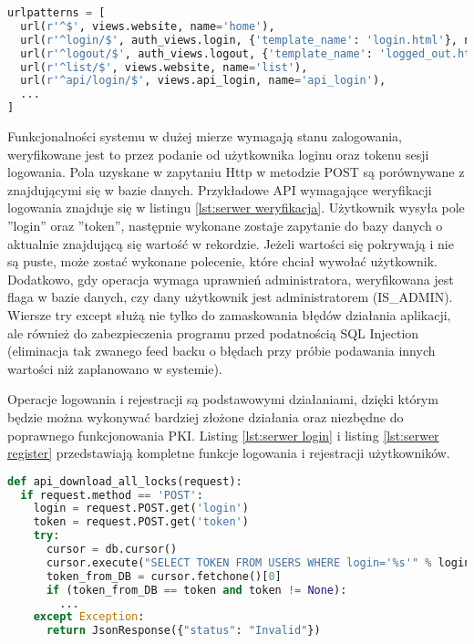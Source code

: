 {\footnotesize 
\begin{lstlisting}[caption={Fragment pliku urls.py}, label={lst:python url}, language=Python]
urlpatterns = [
  url(r'^$', views.website, name='home'),
  url(r'^login/$', auth_views.login, {'template_name': 'login.html'}, name='login'),
  url(r'^logout/$', auth_views.logout, {'template_name': 'logged_out.html'}, name='logout'),
  url(r'^list/$', views.website, name='list'),
  url(r'^api/login/$', views.api_login, name='api_login'),
  ...
]
\end{lstlisting}}

	Funkcjonalności systemu w  dużej mierze wymagają stanu zalogowania, weryfikowane jest to przez podanie od użytkownika loginu oraz tokenu sesji logowania. Pola uzyskane w zapytaniu Http w metodzie POST są porównywane z znajdującymi się w bazie danych. Przykładowe API wymagające weryfikacji logowania znajduje się w listingu \ref{lst:serwer weryfikacja}. Użytkownik wysyła pole ''login'' oraz ''token'', następnie wykonane zostaje zapytanie do bazy danych o aktualnie znajdującą się wartość w rekordzie. Jeżeli wartości się pokrywają i nie są puste, może zostać wykonane polecenie, które chciał wywołać użytkownik. Dodatkowo, gdy operacja wymaga uprawnień administratora, weryfikowana jest flaga w bazie danych, czy dany użytkownik jest administratorem (IS\_ADMIN). Wiersze try except służą nie tylko do zamaskowania błędów działania aplikacji, ale również do zabezpieczenia programu przed podatnością SQL Injection (eliminacja tak zwanego feed backu o błędach przy próbie podawania innych wartości niż zaplanowano w systemie).
	
	Operacje logowania i rejestracji są podstawowymi działaniami, dzięki którym będzie można wykonywać bardziej złożone działania oraz niezbędne do poprawnego funkcjonowania PKI. Listing \ref{lst:serwer login} i listing \ref{lst:serwer register} przedstawiają kompletne funkcje logowania i rejestracji użytkowników. 
\newpage	
	{\footnotesize 
	\begin{lstlisting}[caption={Przykładowe API weryfikujące stan logowania}, label={lst:serwer weryfikacja}, language=Python]
def api_download_all_locks(request):
  if request.method == 'POST':
    login = request.POST.get('login')
    token = request.POST.get('token')
    try:
      cursor = db.cursor()
      cursor.execute("SELECT TOKEN FROM USERS WHERE login='%s'" % login)
      token_from_DB = cursor.fetchone()[0]
      if (token_from_DB == token and token != None):
        ...
    except Exception:
      return JsonResponse({"status": "Invalid"})
	\end{lstlisting}}

